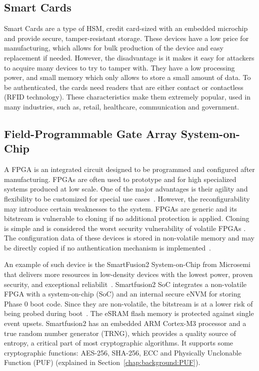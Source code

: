 \subsection*{Smart Cards}\label{chap:background:computing:smartcards}
Smart Cards are a type of \ac{HSM}, credit card-sized with an embedded microchip and provide secure, tamper-resistant storage. These devices have a low price for manufacturing, which allows for bulk production of the device and easy replacement if needed. However, the disadvantage is it makes it easy for attackers to acquire many devices to try to tamper with. They have a low processing power, and small memory which only allows to store a small amount of data. To be authenticated, the cards need readers that are either contact or contactless (RFID technology). These characteristics make them extremely popular, used in many industries, such as, retail, healthcare, communication and government.

\subsection{Field-Programmable Gate Array System-on-Chip}\label{chap:background:computing:smartfusion}
A \ac{FPGA} is an integrated circuit designed to be programmed and configured after manufacturing. \ac{FPGA}s are often used to prototype and for high specialized systems produced at low scale. One of the major advantages is their agility and flexibility to be customized for special use cases~\cite{cyberphysicalsystems}. However, the reconfigurability may introduce certain weaknesses to the system. \ac{FPGA}s are generic and its bitstream is vulnerable to cloning if no additional protection is applied. Cloning is simple and is considered the worst security vulnerability of volatile \ac{FPGA}s \cite{fpgasurvey}. The configuration data of these devices is stored in non-volatile memory and may be directly copied if no authentication mechanism is implemented~\cite{drimer2007authentication}.

An example of such device is the SmartFusion2 System-on-Chip from Microsemi that delivers more resources in low-density devices with the lowest power, proven security, and exceptional reliabilit~\cite{smartfusion2soc}. Smartfusion2 SoC integrates a non-volatile \ac{FPGA} with a system-on-chip (SoC) and an internal secure eNVM for storing Phase 0 boot code. Since they are non-volatile, the bitstream is at a lower risk of being probed during boot~\cite{parrinha2017flexible}. The eSRAM flash memory is protected against single event upsets. Smartfusion2 has an embedded ARM Cortex-M3 processor and a true random number generator (TRNG), which provides a quality source of entropy, a critical part of most cryptographic algorithms. It supports some cryptographic functions: AES-256, SHA-256, ECC and Physically Unclonable Function (PUF) (explained in Section~\ref{chap:background:PUF}).

